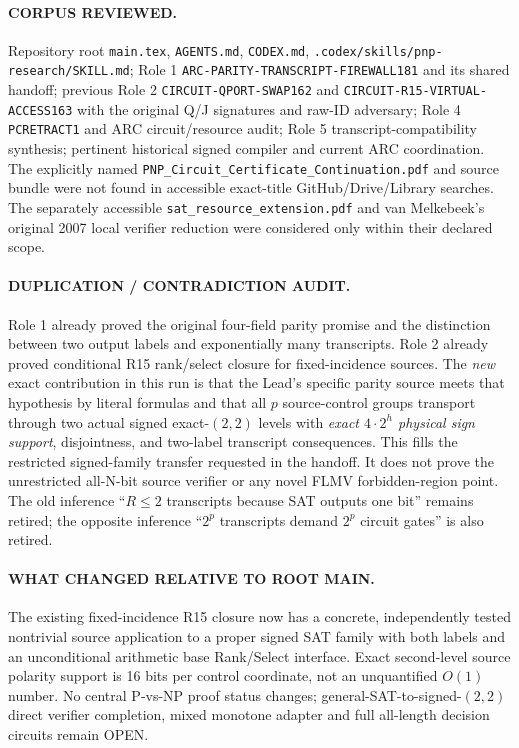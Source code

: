 \documentclass[11pt]{article}
\begin{document}
\paragraph{CORPUS REVIEWED.} Repository root \texttt{main.tex}, \texttt{AGENTS.md}, \texttt{CODEX.md}, \texttt{.codex/skills/pnp-research/SKILL.md}; Role 1 \texttt{ARC-PARITY-TRANSCRIPT-FIREWALL181} and its shared handoff; previous Role 2 \texttt{CIRCUIT-QPORT-SWAP162} and \texttt{CIRCUIT-R15-VIRTUAL-ACCESS163} with the original Q/J signatures and raw-ID adversary; Role 4 \texttt{PCRETRACT1} and ARC circuit/resource audit; Role 5 transcript-compatibility synthesis; pertinent historical signed compiler and current ARC coordination. The explicitly named \texttt{PNP\_Circuit\_Certificate\_Continuation.pdf} and source bundle were not found in accessible exact-title GitHub/Drive/Library searches. The separately accessible \texttt{sat\_resource\_extension.pdf} and van Melkebeek's original 2007 local verifier reduction were considered only within their declared scope.

\paragraph{DUPLICATION / CONTRADICTION AUDIT.} Role 1 already proved the original four-field parity promise and the distinction between two output labels and exponentially many transcripts. Role 2 already proved conditional R15 rank/select closure for fixed-incidence sources. The \emph{new} exact contribution in this run is that the Lead's specific parity source meets that hypothesis by literal formulas and that all $p$ source-control groups transport through two actual signed exact-$(2,2)$ levels with \emph{exact $4\cdot2^h$ physical sign support}, disjointness, and two-label transcript consequences. This fills the restricted signed-family transfer requested in the handoff. It does not prove the unrestricted all-N-bit source verifier or any novel FLMV forbidden-region point. The old inference ``$R\le2$ transcripts because SAT outputs one bit'' remains retired; the opposite inference ``$2^p$ transcripts demand $2^p$ circuit gates'' is also retired.

\paragraph{WHAT CHANGED RELATIVE TO ROOT MAIN.} The existing fixed-incidence R15 closure now has a concrete, independently tested nontrivial source application to a proper signed SAT family with both labels and an unconditional arithmetic base Rank/Select interface. Exact second-level source polarity support is 16 bits per control coordinate, not an unquantified $O(1)$ number. No central P-vs-NP proof status changes; general-SAT-to-signed-$(2,2)$ direct verifier completion, mixed monotone adapter and full all-length decision circuits remain OPEN.
\end{document}
